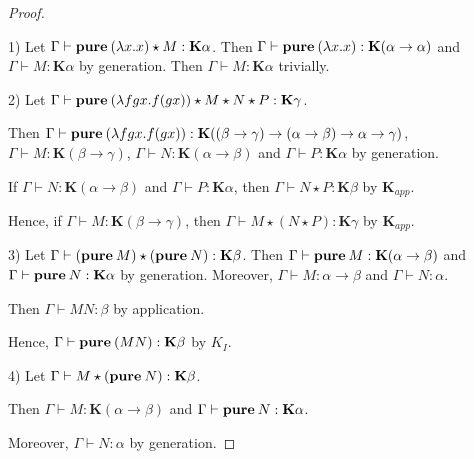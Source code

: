\documentclass[a4paper]{article}
\begin{document}
  \begin{proof}

  $ $

\vspace{\baselineskip}

  1) Let $\Gamma \vdash {\bf pure \: } (\lambda x. x) \star M : \textbf{K}\alpha$. Then $\Gamma \vdash
  {\bf pure \: } (\lambda x.x) : \textbf{K}(\alpha \to \alpha)$ and $\Gamma \vdash M : \textbf{K}\alpha$ by
  generation. Then $\Gamma \vdash M : \textbf{K}\alpha$ trivially.

\vspace{\baselineskip}

  2) Let $\Gamma \vdash {\bf pure \: }(\lambda f g x. f (g x)) \star M \star N \star P : \textbf{K}\gamma$.

  Then $\Gamma \vdash {\bf pure \: } (\lambda f g x. f (g x)) : \textbf{K}((\beta \to \gamma) \to (\alpha \to \beta)
  \to \alpha \to \gamma)$, $\Gamma \vdash M : \textbf{K}(\beta \to \gamma)$, $\Gamma \vdash N :
  \textbf{K}(\alpha \to \beta)$ and $\Gamma \vdash P : \textbf{K}\alpha$ by generation.

  If $\Gamma \vdash N : \textbf{K}(\alpha \to \beta)$ and $\Gamma \vdash P : \textbf{K}\alpha$, then $\Gamma
  \vdash N \star P : \textbf{K}\beta$ by $\textbf{K}_{app}$.

  Hence, if $\Gamma \vdash M : \textbf{K}(\beta \to \gamma)$, then $\Gamma \vdash M \star (N \star P) :
  \textbf{K}\gamma$ by $\textbf{K}_{app}$.

\vspace{\baselineskip}

  3) Let $\Gamma \vdash ({\bf pure \: } M) \star ({\bf pure \: } N) : \textbf{K}\beta$. Then $\Gamma \vdash
  {\bf pure \: } M : \textbf{K}(\alpha \to \beta)$ and $\Gamma \vdash {\bf pure \: } N : \textbf{K}\alpha$ by
  generation. Moreover, $\Gamma \vdash M : \alpha \to \beta$ and $\Gamma \vdash N : \alpha$.

  Then $\Gamma \vdash M N : \beta$ by application.

  Hence, $\Gamma \vdash {\bf pure \: } (M N) : \textbf{K}\beta$ by $K_I$.

\vspace{\baselineskip}

  4) Let $\Gamma \vdash M \star ({\bf pure \: } N) : \textbf{K}\beta$.

  Then $\Gamma \vdash M : \textbf{K}(\alpha \to \beta)$ and $\Gamma \vdash {\bf pure \: } N : \textbf{K}\alpha$.

  Moreover, $\Gamma \vdash N : \alpha$ by generation.


\end{proof}
\end{document}
